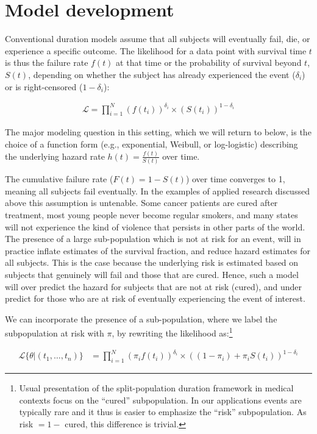 \documentclass[article]{jss}
\begin{document}
\section{Model development}

Conventional duration models assume that all subjects will eventually
fail, die, or experience a specific outcome. The likelihood for a data
point with survival time \(t\) is thus the failure rate \(f(t)\) at that
time or the probability of survival beyond \(t\), \(S(t)\), depending on
whether the subject has already experienced the event (\(\delta_i\)) or
is right-censored (\(1-\delta_i\)):

\begin{eqnarray}
\mathcal{L} = \prod_{i=1}^N  \left( f(t_i)\right)^{\delta_i} \times \left( S(t_i) \right)^{1-\delta_i}
\end{eqnarray}

The major modeling question in this setting, which we will return to
below, is the choice of a function form (e.g., exponential, Weibull, or
log-logistic) describing the underlying hazard rate
\(h(t) = \frac{f(t)}{S(t)}\) over time.

The cumulative failure rate (\(F(t) = 1 - S(t)\)) over time converges to
1, meaning all subjects fail eventually. In the examples of applied
research discussed above this assumption is untenable. Some cancer
patients are cured after treatment, most young people never become
regular smokers, and many states will not experience the kind of
violence that persists in other parts of the world. The presence of a
large sub-population which is not at risk for an event, will in practice
inflate estimates of the survival fraction, and reduce hazard estimates
for all subjects. This is the case because the underlying risk is
estimated based on subjects that genuinely will fail and those that are
cured. Hence, such a model will over predict the hazard for subjects
that are not at risk (cured), and under predict for those who are at
risk of eventually experiencing the event of interest.

We can incorporate the presence of a sub-population, where we label the
subpopulation at risk with \(\pi\), by rewriting the likelihood
as:\footnote{Usual presentation of the split-population duration framework in medical contexts focus on the ``cured'' subpopulation. In our applications events are typically rare and it thus is easier to emphasize the ``risk'' subpopulation. As risk $= 1 - $ cured, this difference is trivial.}

\begin{align}
\mathcal{L}\{\theta|(t_{1}, \dots, t_{n})\} &= \prod_{i=1}^{N} \left(\pi_i f(t_i)\right)^{\delta_i} \times  \left((1-\pi_i) + \pi_i S(t_i)\right)^{1-\delta_i}
\end{align}
\end{document}
